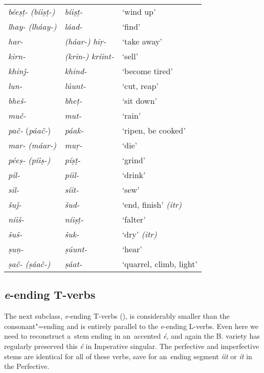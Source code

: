 \begin{table}[H]
\begin{tabularx}{\textwidth}{ l@{\hspace{40pt}} l@{\hspace{40pt}} Q }
\textit{béeṣṭ-} \textit{(bíiṣṭ-)} &
\textit{bíiṣṭ-}	&
`wind up' \\
\textit{lhay-} \textit{(lháay-)}	&
\textit{láad-}	&
`find' \\
\textit{har-} &
\textit{(háar-)}	\textit{hiṛ-}	&
`take away' \\
\textit{kirn-} &
\textit{(krin-)} \textit{kríint-}	&
`sell' \\
\textit{khinǰ-}&
\textit{khind-}	&
`become tired' \\
\textit{lun-} &
\textit{lúunt-}	&
`cut, reap' \\
\textit{bheš-} &
\textit{bheṭ-}	&
`sit down' \\
\textit{muč-} &
\textit{mut-}	&
`rain' \\
\textit{\textit{pač-}} (\textit{páač-})	&
\textit{páak-}	&
`ripen, be cooked' \\
\textit{mar-} \textit{(máar-)}&
\textit{muṛ-}	&
`die' \\
\textit{péeṣ-} \textit{(píiṣ-)} &
\textit{píṣṭ-}	&
`grind' \\
\textit{pil-} &\textit{píil-}	&
`drink' \\
\textit{sil-} &\textit{síit-}	&
`sew' \\
\textit{šuǰ-} &\textit{šud-}	&
`end, finish' \textit{(itr)}\\
\textit{níiš-} &\textit{níiṣṭ-}	&
`falter' \\
\textit{šuš-} &\textit{šuk-}	&
`dry'  \textit{(itr)} \\
\textit{ṣuṇ-} &\textit{ṣúunt-}	&
`hear' \\
\textit{ṣač-} \textit{(ṣáač-)} &	\textit{ṣáat-}	&
`quarrel, climb, light' \\
\end{tabularx}
\end{table}

\subsection{\textit{e}-ending T-verbs}
\label{subsec:8-3-6}


The next subclass, \textit{e}-ending T-verbs (), is considerably smaller than the consonant"=ending and is entirely parallel to the \textit{e}-ending L-verbs. Even here we need to reconstruct a~stem ending in an~accented \textit{é}, and again the B. variety has regularly preserved this \textit{é} in Imperative singular. The perfective and imperfective stems are identical for all of these verbs, save for an~ending segment \textit{íit} or \textit{ít} in the Perfective.


